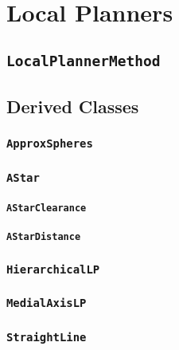 \chapter{Local Planners}

\section{\texttt{LocalPlannerMethod}}

\section{Derived Classes}

\subsection{\texttt{ApproxSpheres}}

\subsection{\texttt{AStar}}

\subsubsection{\texttt{AStarClearance}}

\subsubsection{\texttt{AStarDistance}}

\subsection{\texttt{HierarchicalLP}}

\subsection{\texttt{MedialAxisLP}}

\subsection{\texttt{StraightLine}}

